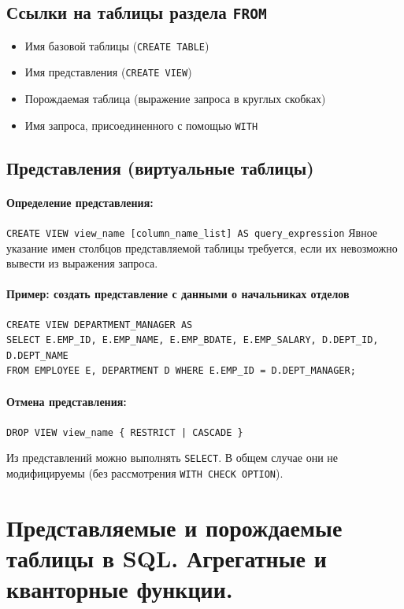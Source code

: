 \documentclass[a4paper,12pt]{article}
\begin{document}
\subsection{Ссылки на таблицы раздела \texttt{FROM}}

\begin{itemize}
    \item Имя базовой таблицы (\texttt{CREATE TABLE})
    \item Имя представления (\texttt{CREATE VIEW})
    \item Порождаемая таблица (выражение запроса в круглых скобках)
    \item Имя запроса, присоединенного с помощью \texttt{WITH}
\end{itemize}

\subsection{Представления (виртуальные таблицы)}

\paragraph{Определение представления:}  
\texttt{CREATE VIEW view\_name [column\_name\_list] AS query\_expression}  
Явное указание имен столбцов представляемой таблицы требуется, если их невозможно вывести из выражения запроса.

\paragraph{Пример: создать представление с данными о начальниках отделов}  
\begin{lstlisting}
CREATE VIEW DEPARTMENT_MANAGER AS
SELECT E.EMP_ID, E.EMP_NAME, E.EMP_BDATE, E.EMP_SALARY, D.DEPT_ID, D.DEPT_NAME
FROM EMPLOYEE E, DEPARTMENT D WHERE E.EMP_ID = D.DEPT_MANAGER;
\end{lstlisting}

\paragraph{Отмена представления:}  
\texttt{DROP VIEW view\_name \{ RESTRICT | CASCADE \}}

Из представлений можно выполнять \texttt{SELECT}. В общем случае они не модифицируемы (без рассмотрения \texttt{WITH CHECK OPTION}).

\section{Представляемые и порождаемые таблицы в SQL. Агрегатные и кванторные функции.}
\end{document}
